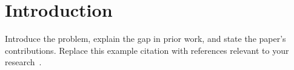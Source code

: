 \section{Introduction}

Introduce the problem, explain the gap in prior work, and state the paper's contributions.
Replace this example citation with references relevant to your research~\citep{ho2020denoising}.
